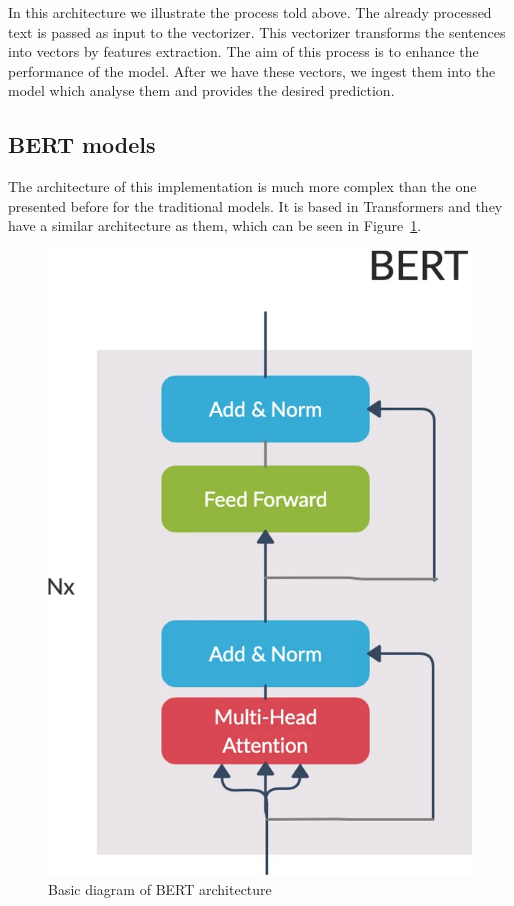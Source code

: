 In this architecture we illustrate the process told above. The already processed text is passed as input to the vectorizer. This vectorizer transforms the sentences into vectors by features extraction. The aim of this process is to enhance the performance of the model. After we have these vectors, we ingest them into the model which analyse them and provides the desired prediction.

\subsection{BERT models}
The architecture of this implementation is much more complex than the one presented before for the traditional models. It is based in Transformers and they have a similar architecture as them, which can be seen in Figure~\ref{fig:BERTarchitecture}.

\begin{figure}[!htp]
    \centering
    \includegraphics[scale=0.3]{img/detection/bertarchitecture.png}
    \caption{Basic diagram of BERT architecture}
    \label{fig:BERTarchitecture}
\end{figure}

